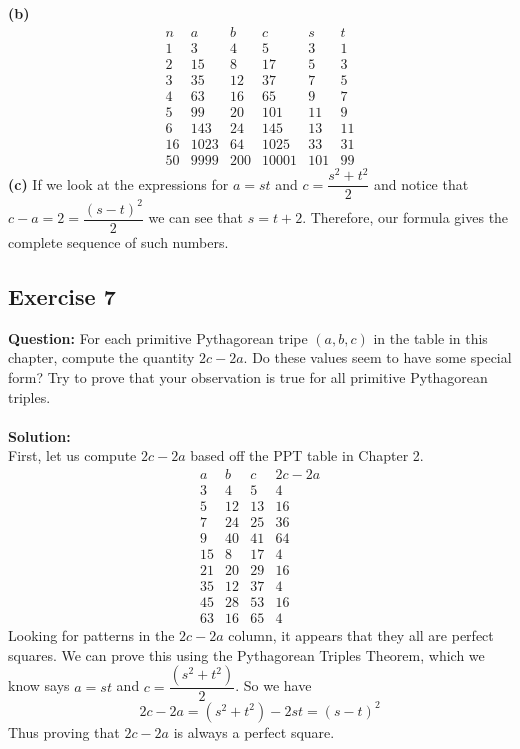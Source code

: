 \documentclass{article}
\begin{document}
\textbf{(b)}
\begin{displaymath}
\begin{array}{c|c|c|c|c|c}
n & a & b & c & s & t\\
\hline
1 & 3 & 4 & 5 & 3 & 1\\
2 & 15 & 8 & 17 & 5 & 3\\
3 & 35 & 12 & 37 & 7 & 5\\
4 & 63 & 16 & 65 & 9 & 7\\
5 & 99 & 20 & 101 & 11 & 9\\
6 & 143 & 24 & 145 & 13 & 11\\
16 & 1023 & 64 & 1025 & 33 & 31\\
50 & 9999 & 200 & 10001 & 101 & 99
\end{array}
\end{displaymath}
\textbf{(c)} If we look at the expressions for $a = st$ and $c = \dfrac{s^2+t^2}{2}$ and notice that $c-a=2=\dfrac{(s-t)^2}{2}$ we can see that $s = t+2$. Therefore, our formula gives the complete sequence of such numbers.
\newpage
\subsection{Exercise 7}
\textbf{Question:} For each primitive Pythagorean tripe $(a,b,c)$ in the table in this chapter, compute the quantity $2c-2a$. Do these values seem to have some special form? Try to prove that your observation is true for all primitive Pythagorean triples.\\
\\\textbf{Solution:}\\
First, let us compute $2c-2a$ based off the PPT table in Chapter 2.
\begin{displaymath}
\begin{array}{c|c|c|c|}
a & b & c & 2c-2a\\
\hline
3&4&5&4\\
5&12&13&16\\
7&24&25&36\\
9&40&41&64\\
15&8&17&4\\
21&20&29&16\\
35&12&37&4\\
45&28&53&16\\
63&16&65&4
\end{array}
\end{displaymath}
Looking for patterns in the $2c-2a$ column, it appears that they all are perfect squares. We can prove this using the Pythagorean Triples Theorem, which we know says $a = st$ and $c = \dfrac{(s^{2}+t^{2})}{2}$. So we have
\begin{equation*}
2c-2a = (s^{2}+t^{2})-2st = (s-t)^{2}
\end{equation*}
Thus proving that $2c-2a$ is always a perfect square.
\newpage
\end{document}
